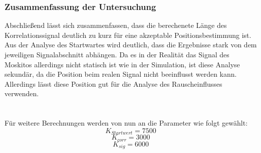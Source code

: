 \subsubsection{Zusammenfassung der Untersuchung }
Abschließend lässt sich zusammenfassen, dass die berechenete Länge des Korrelationssignal deutlich zu kurz für eine akzeptable Positionsbestimmung ist. Aus der Analyse des Startwartes wird deutlich, dass die Ergebnisse stark von dem jeweiligen Signalabschnitt abhängen. Da es in der Realität das Signal des Moskitos allerdings nicht statisch ist wie in der Simulation, ist diese Analyse sekundär, da die Position beim realen Signal nicht beeinflusst werden kann. Allerdings lässt diese Position gut für die Analyse des Rauscheinflusses verwenden. \\\\\\
Für weitere Berechnungen werden von nun an die Parameter wie folgt gewählt:\\
$$K_{Startwert} = 7500$$
$$K_{corr} = 3000$$
$$K_{sig} = 6000$$
